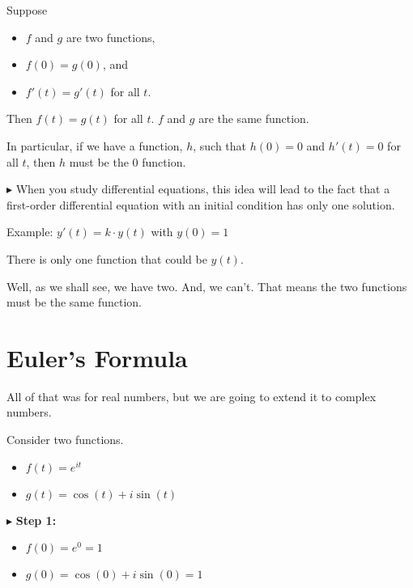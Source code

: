 \documentclass{ximera}
\begin{document}
Suppose 

\begin{itemize}
\item $f$ and $g$ are two functions,
\item $f(0) = g(0)$, and
\item $f'(t) = g'(t)$  for all $t$.
\end{itemize}

Then $f(t)=g(t)$ for all $t$.   $f$ and $g$ are the same function.



In particular, if we have a function, $h$, such that $h(0)=0$  and $h'(t)=0$ for all $t$, then $h$ must be the $0$ function.






$\blacktriangleright$  When you study differential equations, this idea will lead to the fact that a first-order differential equation with an initial condition has only one solution.

Example: $y'(t) = k \cdot y(t)$ with $y(0)=1$


There is only one function that could be $y(t)$.

Well, as we shall see, we have two.  And, we can't.  That means the two functions must be the same function.








\section{Euler's Formula}

All of that was for real numbers, but we are going to extend it to complex numbers.




Consider two functions.


\begin{itemize}
	\item $f(t) = e^{i t}$
	\item $g(t) = \cos(t) + i \sin(t)$
\end{itemize}




$\blacktriangleright$   \textbf{Step 1:}

\begin{itemize}
	\item $f(0) = e^0 = 1$
	\item $g(0) = \cos(0) + i \sin(0) = 1$
\end{itemize}
\end{document}
